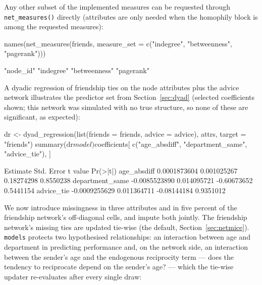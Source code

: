 \documentclass[11pt,a4paper]{article}
\newcommand{\code}[1]{\texttt{#1}}
\begin{document}
Any other subset of the implemented measures can be requested through
\code{net\_measures()} directly (attributes are only needed when the
homophily block is among the requested measures):

\begin{Rinput}
names(net_measures(friends, measure_set = c("indegree", "betweenness",
                                            "pagerank")))
\end{Rinput}

\begin{Routput}
[1] "node_id"     "indegree"    "betweenness" "pagerank"
\end{Routput}

A dyadic regression of friendship ties on the node attributes plus the
advice network illustrates the predictor set from
Section~\ref{sec:dyad} (selected coefficients shown; this network was
simulated with no true structure, so none of these are significant, as
expected):

\begin{Rinput}
dr <- dyad_regression(list(friends = friends, advice = advice),
                       attrs, target = "friends")
summary(dr$model)$coefficients[
  c("age_absdiff", "department_same", "advice_tie"), ]
\end{Rinput}

\begin{Routput}
                     Estimate  Std. Error     t value  Pr(>|t|)
age_absdiff      0.0001873604 0.001025267  0.18274298 0.8550238
department_same -0.0085523890 0.014095721 -0.60673652 0.5441154
advice_tie      -0.0009255629 0.011364711 -0.08144184 0.9351012
\end{Routput}

We now introduce missingness in three attributes and in five percent of the
friendship network's off-diagonal cells, and impute both jointly. The
friendship network's missing ties are updated tie-wise (the default,
Section~\ref{sec:netmice}). \code{models} protects two hypothesised
relationships: an interaction between age and department in predicting
performance and, on the network side, an interaction between the sender's
age and the endogenous reciprocity term --- does the tendency to
reciprocate depend on the sender's age? --- which the tie-wise updater
re-evaluates after every single draw:

\end{document}
